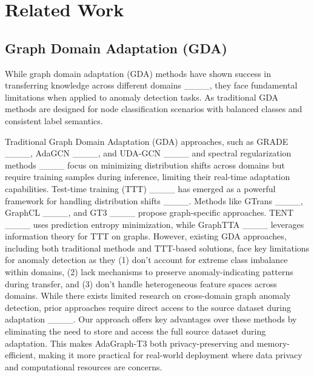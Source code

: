 \section{Related Work}
\subsection{Graph Domain Adaptation (GDA)}
While graph domain adaptation (GDA) methods have shown success in transferring knowledge across different domains ____, they face fundamental limitations when applied to anomaly detection tasks. As traditional GDA methods are designed for node classification scenarios with balanced classes and consistent label semantics. 


Traditional Graph Domain Adaptation (GDA) approaches, such as GRADE ____, AdaGCN ____, and UDA-GCN ____ and spectral regularization methods ____ focus on minimizing distribution shifts across domains but require training samples during inference, limiting their real-time adaptation capabilities. Test-time training (TTT) ____ has emerged as a powerful framework for handling distribution shifts ____. Methods like GTrans ____, GraphCL ____, and GT3 ____ propose graph-specific approaches. TENT ____
uses prediction entropy minimization, while GraphTTA ____ leverages information theory for TTT on graphs. However, existing GDA approaches, including both traditional methods and TTT-based solutions, face key limitations for anomaly detection as they (1) don't account for extreme class imbalance within domains, (2) lack mechanisms to preserve anomaly-indicating patterns during transfer, and (3) don't handle heterogeneous feature spaces across domains. While there exists limited research on cross-domain graph anomaly detection, prior approaches require direct access to the source dataset during adaptation ____. Our approach offers key advantages over these methods by eliminating the need to store and access the full source dataset during adaptation. This makes AdaGraph-T3 both privacy-preserving and memory-efficient, making it more practical for real-world deployment where data privacy and computational resources are concerns.

